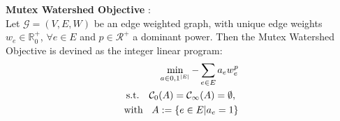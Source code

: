  \begin{defn}
 	\textbf{Mutex Watershed Objective} \cite{wolf2019mutex}: \\
 	Let $\mathcal{G} = (V, E, W)$ be an edge weighted graph, with unique edge weights $w_e \in \mathbb{R}_0^+$, $\forall e \in E$ and $p \in \mathcal{R}^+$ a dominant power. Then the Mutex Watershed Objective is devined as the integer linear program:\\
 	\begin{align}
 		\min_{a\in {0,1}^{|E|}} - \sum_{e \in E} a_e w_e^p \\
		\text{s.t. \hspace{2mm}} \mathcal{C}_0(A) = \mathcal{C_1}(A) = \emptyset \text{, }\\
		\text{with \hspace{2mm}} A := \{ e \in E|a_e = 1 \}
 	\end{align}
 \end{defn}
